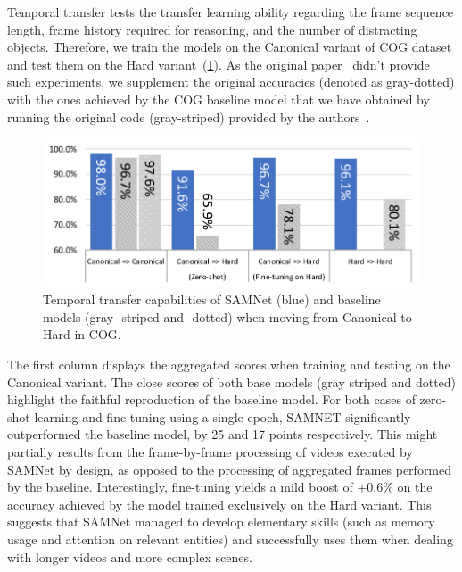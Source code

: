 Temporal transfer tests the transfer learning ability regarding the frame sequence length, frame history required for reasoning, and the number of distracting objects.
Therefore, we train the models on the Canonical variant of COG dataset and test them on the Hard variant~(\cref{fig:samnet_cog_overall_transfer}).
As the original paper~\cite{yang2018dataset} didn't provide such experiments, we supplement the original accuracies (denoted as gray-dotted) with the ones achieved by the COG baseline model that we have obtained by running the original code (gray-striped) provided by the authors~\cite{yang2018implement}.

\begin{figure}[htbp]
	\centering
	\includegraphics[width=\columnwidth]{../img/plots/cog_temporal_transfer_baselines.pdf}
	\caption{Temporal transfer capabilities of SAMNet (blue) and baseline models (gray -striped and -dotted) when moving from Canonical to Hard  in COG.}
	\label{fig:samnet_cog_overall_transfer}
\end{figure}

The first column displays the aggregated scores when training and testing on the Canonical variant.
The close scores of both base models (gray striped and dotted) highlight the faithful reproduction of the baseline model.
For both cases of zero-shot learning and fine-tuning using a single epoch, SAMNET significantly outperformed the baseline model, by 25 and 17 points respectively.
This might partially results from the frame-by-frame processing of videos executed by SAMNet by design, as opposed to the processing of aggregated frames performed by the baseline.
Interestingly, fine-tuning yields a mild boost of +0.6\% on the accuracy achieved by the model trained exclusively on the Hard variant.
This suggests that SAMNet managed to develop elementary skills (such as memory usage and attention on relevant entities) and successfully uses them when dealing with longer videos and more complex scenes.

